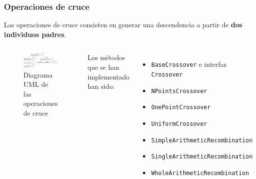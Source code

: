 \documentclass{beamer}
\begin{document}
\begin{frame}
\frametitle{Operaciones de cruce}

Las operaciones de cruce consisten en generar una descendencia a partir de \textbf{dos individuos padres}.

\bigskip

\begin{columns}
    \begin{figure}
        \centering
        \includegraphics[scale=0.1]{mem/images/cap-4/4.2.6(Crossover)/Crossover.png}
        \caption{Diagrama UML de las operaciones de cruce}
        \label{fig:my_label}
    \end{figure}
    Los métodos que se han implementado han sido:
    \begin{itemize}
        \item \texttt{BaseCrossover} e interfaz \texttt{Crossover}
        \item \texttt{NPointsCrossover}
        \item \texttt{OnePointCrossover}
        \item \texttt{UniformCrossover}
        \item \texttt{SimpleArithmeticRecombination}
        \item \texttt{SingleArithmeticRecombination}
        \item \texttt{WholeArithmeticRecombination}
    \end{itemize}
\end{columns}

\end{frame}
\end{document}
